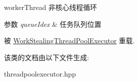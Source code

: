 worker\+Thread 非核心线程循环 


\begin{DoxyParams}{参数}
{\em queue\+Idex} & 任务队列位置 \\
\hline
\end{DoxyParams}


被 \hyperlink{classWorkStealingThreadPoolExecutor_a962c0965822cd961984928ec26d61d4e}{Work\+Stealing\+Thread\+Pool\+Executor} 重载.



该类的文档由以下文件生成\+:\begin{DoxyCompactItemize}
\item 
threadpoolexecutor.\+hpp\end{DoxyCompactItemize}
